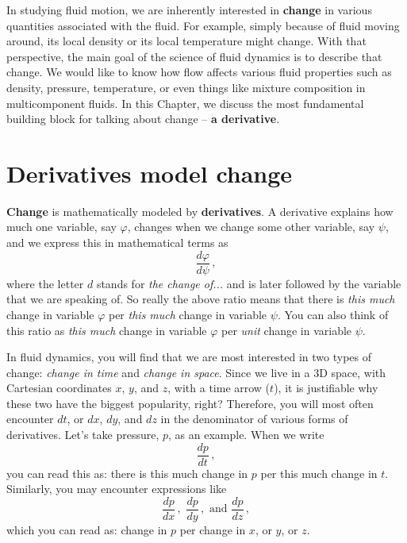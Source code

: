 

In studying fluid motion, we are inherently interested in \textbf{change} in various quantities associated with the fluid. For example, simply because of fluid moving around, its local density or its local temperature might change. With that perspective, the main goal of the science of fluid dynamics is to describe that change. We would like to know how flow affects various fluid properties such as density, pressure, temperature, or even things like mixture composition in multicomponent fluids.
In this Chapter, we discuss the most fundamental building block for talking about change -- \textbf{a derivative}.

\section{Derivatives model change}

\textbf{Change} is mathematically modeled by \textbf{derivatives}. A derivative explains how much one variable, say $\varphi$, changes when we change some other variable, say $\psi$, and we express this in mathematical terms as
\begin{equation*}\label{eq:change-d}
\frac{d \varphi}{d \psi} \, ,
\end{equation*}
where the letter $d$ stands for \textit{the change of...} and is later followed by the variable that we are speaking of. So really the above ratio means that there is \textit{this much} change in variable $\varphi$ per \textit{this much} change in variable $\psi$. You can also think of this ratio as \textit{this much} change in variable $\varphi$ per \textit{unit} change in variable $\psi$.

In fluid dynamics, you will find that we are most interested in two types of change: \textit{change in time} and \textit{change in space}. Since we live in a 3D space, with Cartesian coordinates $x$, $y$, and $z$, with a time arrow ($t$), it is justifiable why these two have the biggest popularity, right? Therefore, you will most often encounter $dt$, or $dx$, $dy$, and $dz$ in the denominator of various forms of derivatives.
Let's take pressure, $p$, as an example. When we write
\begin{equation*}\label{eq:change-p}
\frac{d p}{d t} \, ,
\end{equation*}
you can read this as: there is this much change in $p$ per this much change in $t$.
Similarly, you may encounter expressions like
\begin{equation*}\label{eq:change-p}
\frac{d p}{d x} \,  , \,\, \frac{d p}{d y} \, , \,\, \text{and} \,\, \frac{d p}{d z} \, ,
\end{equation*}
which you can read as: change in $p$ per change in $x$, or $y$, or $z$.


